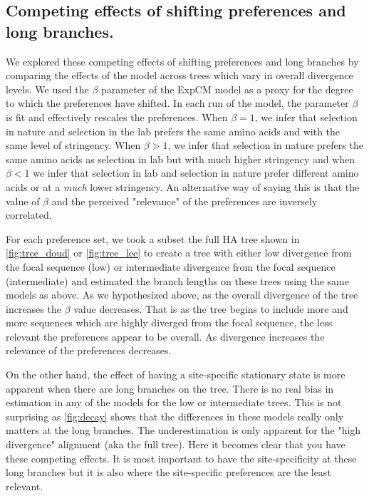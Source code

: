\documentclass[11pt]{article}
\begin{document}
\subsection{Competing effects of shifting preferences and long branches.}
We explored these competing effects of shifting preferences and long branches by comparing the effects of the model across trees which vary in overall divergence levels. 
We used the $\beta$ parameter of the ExpCM model as a proxy for the degree to which the preferences have shifted. 
In each run of the model, the parameter $\beta$ is fit and effectively rescales the preferences. 
When $\beta = 1$, we infer that selection in nature and selection in the lab prefers the same amino acids and with the same level of stringency. 
When $\beta > 1$, we infer that selection in nature prefers the same amino acids as selection in lab but with much higher stringency and when $\beta < 1$ we infer that selection in lab and selection in nature prefer different amino acids or at a \textit{much} lower stringency. 
An alternative way of saying this is that the value of $\beta$ and the perceived "relevance" of the preferences are inversely correlated. 

For each preference set, we took a subset the full HA tree shown in \ref{fig:tree_doud} or \ref{fig:tree_lee} to create a tree with either low divergence from the focal sequence (low) or intermediate divergence from the focal sequence (intermediate) and estimated the branch lengths on these trees using the same models as above. 
As we hypothesized above, as the overall divergence of the tree increases the $\beta$ value decreases. 
That is as the tree begins to include more and more sequences which are highly diverged from the focal sequence, the less relevant the preferences appear to be overall. 
As divergence increases the relevance of the preferences decreases. 

On the other hand, the effect of having a site-specific stationary state is more apparent when there are long branches on the tree.
There is no real bias in estimation in any of the models for the low or intermediate trees. 
This is not surprising as \ref{fig:decay} shows that the differences in these models really only matters at the long branches. 
The underestimation is only apparent for the "high divergence" alignment (aka the full tree). 
Here it becomes clear that you have these competing effects. 
It is most important to have the site-specificity at these long branches but it is also where the site-specific preferences are the least relevant. 
\end{document}

